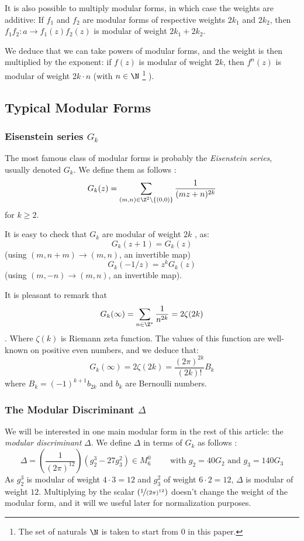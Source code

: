 It is also possible to multiply modular forms, in which case the weights are additive:
If $f_1$ and $f_2$ are modular forms of respective weights $2k_1$ and $2k_2$, then $f_1f_2:a \to f_1(z)f_2(z)$ is modular of weight $2k_1+2k_2$.

We deduce that we can take powers of modular forms, and the weight is then multiplied by the exponent:
if $f(z)$ is modular of weight $2k$, then $f^n(z)$ is modular of weight $2k \cdot n$ (with $n \in \N$ \footnote{The set of naturals $\N$ is taken to start from $0$ in this paper.} ).



\subsection{Typical Modular Forms}
\subsubsection{Eisenstein series $G_k$}
The most famous class of modular forms is probably the \textit{Eisenstein series}, usually denoted $G_k$. We define them as follows \cite[Examples of Modular Forms]{ModularFormsComputationalApproach}:
$$
G_k(z) = \sum_{(m,n) \in \Z^2\setminus\{(0,0)\}} \frac{1}{(mz+n)^{2k}}
$$
for $k \geq 2$.

It is easy to check that $G_k$ are modular of weight $2k$ \cite[Proposition 2.1]{ModularFormsComputationalApproach}, as:
$$
G_k(z+1) = G_k(z)
$$
(using $(m,n+m) \to (m,n)$, an invertible map)
$$
G_k(-1/z) = z^k G_k(z)
$$
(using $(m,-n) \to (m,n)$, an invertible map).

It is pleasant to remark that \cite[Proposition 2.2]{ModularFormsComputationalApproach}
$$
G_k(\infty) = \sum_{n \in \Z^*} \frac{1}{n^{2k}} = 2\zeta(2k)
$$.
Where $\zeta(k)$ is Riemann zeta function.
The values of this function are well-known on positive even numbers, and we deduce \cite[p.194]{MathHandbook} that:
$$
G_k(\infty) = 2\zeta(2k) = \frac{(2\pi)^{2k}}{(2k)!}B_k
$$
where $B_k = (-1)^{k+1} b_{2k}$ and $b_k$ are Bernoulli numbers.

\subsubsection{The Modular Discriminant $\Delta$}
We will be interested in one main modular form in the rest of this article: the \textit{modular discriminant} $\Delta$.
We define $\Delta$ in terms of $G_k$ as follows \cite[p.84]{CourseInArithmetic}:
$$
\Delta = \left( \frac{1}{(2\pi)^{12}} \right) (g_2^3 - 27g_3^2) \in M_6^0 \qquad \text{ with } g_2 = 40G_2 \text{ and } g_3 = 140G_3
$$
As $g_2^3$ is modular of weight $4 \cdot 3=12$ and $g_3^2$ of weight $6 \cdot 2 = 12$, $\Delta$ is modular of weight $12$.
Multiplying by the scalar $\left( \nicefrac{1}{(2\pi)^{12}} \right)$ doesn't change the weight of the modular form, and it will we useful later for normalization purposes.

